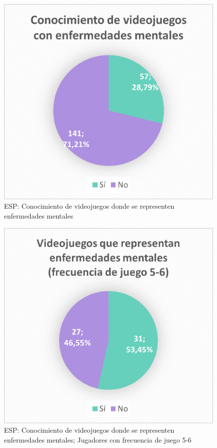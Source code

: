 \documentclass[12pt, a4paper,twoside,titlepage]{book}
\begin{document}
\begin{figure}
    \centering
    \includegraphics[width=.7\linewidth]{ANEXO ESP/12AnexESPVidenf}
    \caption{ESP: Conocimiento de videojuegos donde se representen enfermedades mentales}
    \label{fig:ESPConvid}
\end{figure}

\begin{figure}
    \centering
    \includegraphics[width=.7\linewidth]{ANEXO ESP/13AnexESPConvid56}
    \caption{ESP: Conocimiento de videojuegos donde se representen enfermedades mentales; Jugadores con frecuencia de juego 5-6}
     \label{fig:ESPConvid56}
\end{figure}
\end{document}
